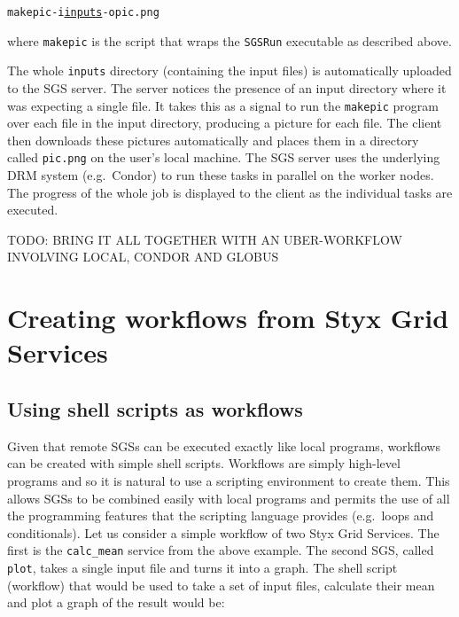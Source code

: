 \documentclass[a4paper]{article}
\begin{document}
\begin{alltt}
   makepic -i \underline{inputs} -o pic.png
\end{alltt}

\noindent where \texttt{makepic} is the script that wraps the \texttt{SGSRun} executable as described above.

The whole \texttt{inputs} directory (containing the input files) is automatically uploaded to the SGS server.  The server notices the presence of an input directory where it was expecting a single file.  It takes this as a signal to run the \texttt{makepic} program over each file in the input directory, producing a picture for each file.  The client then downloads these pictures automatically and places them in a directory called \texttt{pic.png} on the user's local machine.  The SGS server uses the underlying DRM system (e.g.\ Condor) to run these tasks in parallel on the worker nodes.  The progress of the whole job is displayed to the client as the individual tasks are executed.


TODO: BRING IT ALL TOGETHER WITH AN UBER-WORKFLOW INVOLVING LOCAL, CONDOR AND GLOBUS


\section{Creating workflows from Styx Grid Services}

\subsection{Using shell scripts as workflows}\label{sec:shellscripts}
Given that remote SGSs can be executed exactly like local programs, workflows can be created with simple shell scripts.  Workflows are simply high-level programs and so it is natural to use a scripting environment to create them.  This allows SGSs to be combined easily with local programs and permits the use of all the programming features that the scripting language provides (e.g.\ loops and conditionals).  Let us consider a simple workflow of two Styx Grid Services.  The first is the \texttt{calc\_mean} service from the above example.  The second SGS, called \texttt{plot}, takes a single input file and turns it into a graph.  The shell script (workflow) that would be used to take a set of input files, calculate their mean and plot a graph of the result would be:
\end{document}
